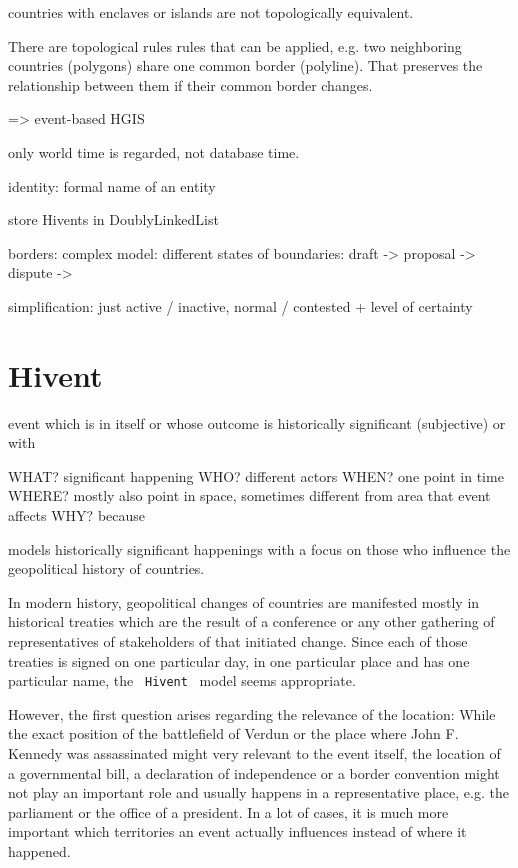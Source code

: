 countries with enclaves or islands are not topologically equivalent.

There are topological rules rules that can be applied, e.g. two neighboring countries (polygons) share one common border (polyline). That preserves the relationship between them if their common border changes.

=> event-based HGIS

only world time is regarded, not database time.

identity: formal name of an entity

store Hivents in DoublyLinkedList

borders: complex model: different states of boundaries: draft -> proposal -> dispute ->

simplification: just active / inactive, normal / contested + level of certainty


\section{Hivent} %
\label{sec:hivent}

event which is in itself or whose outcome is historically significant (subjective) or with

  WHAT? significant happening
  WHO? different actors
  WHEN? one point in time
  WHERE? mostly also point in space, sometimes different from area that event affects
  WHY? because

models historically significant happenings with a focus on those who influence the geopolitical history of countries.

In modern history, geopolitical changes of countries are manifested mostly in historical treaties which are the result of a conference or any other gathering of representatives of stakeholders of that initiated change. Since each of those treaties is signed on one particular day, in one particular place and has one particular name, the ~\texttt{Hivent}~ model seems appropriate.

However, the first question arises regarding the relevance of the location: While the exact position of the battlefield of Verdun or the place where John F. Kennedy was assassinated might very relevant to the event itself, the location of a governmental bill, a declaration of independence or a border convention might not play an important role and usually happens in a representative place, e.g. the parliament or the office of a president. In a lot of cases, it is much more important which territories an event actually influences instead of where it happened.



